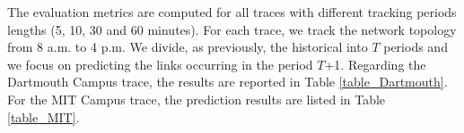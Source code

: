 \documentclass[conference]{IEEEtran}
\begin{document}
The evaluation metrics are computed for all traces with different
tracking periods lengths (5, 10, 30 and 60 minutes). For each trace,
we track the network topology from 8 a.m. to 4 p.m. We divide, as
previously, the historical into $T$ periods and we focus on
predicting the links occurring in the period $T$+1. Regarding the
Dartmouth Campus trace, the results are reported in Table
\ref{table_Dartmouth}. For the MIT Campus trace, the prediction
results are listed in Table \ref{table_MIT}.

\begin{table}[!tb]
\renewcommand{\arraystretch}{1}
\caption{Evaluation metrics for the prediction applied on the
Dartmouth Campus trace} \label{table_Dartmouth} \centering
{}
\end{table}
\end{document}
